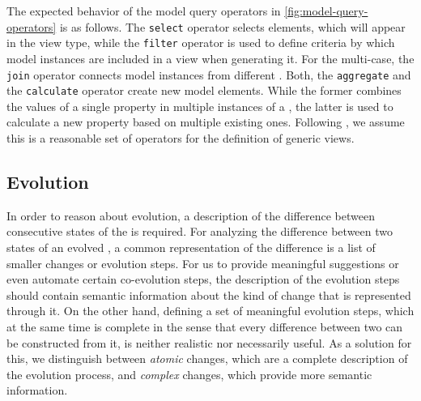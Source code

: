 The expected behavior of the model query operators in \cref{fig:model-query-operators} is as follows.
The \texttt{select} operator selects \metamodel elements, which will appear in the view type, while the \texttt{filter} operator is used to define criteria by which model instances are included in a view when generating it.
For the multi-\metamodel case, the \texttt{join} operator connects model instances from different \metamodels.
Both, the \texttt{aggregate} and the \texttt{calculate} operator create new model elements.
While the former combines the values of a single property in multiple instances of a \metaclass, the latter is used to calculate a new property based on multiple existing ones.
Following \textcite{burger_model-join_2016}, we assume this is a reasonable set of operators for the definition of generic views.

\subsection{\Metamodel Evolution}
\label{sec:MetaModelEvolution}

In order to reason about \metamodel evolution, a description of the difference between consecutive states of the \metamodel is required.
For analyzing the difference between two states of an evolved \metamodel, a common representation of the difference is a list of smaller changes or evolution steps.
For us to provide meaningful suggestions or even automate certain co-evolution steps, the description of the evolution steps should contain semantic information about the kind of change that is represented through it.
On the other hand, defining a set of meaningful evolution steps, which at the same time is complete in the sense that every difference between two \metamodels can be constructed from it, is neither realistic nor necessarily useful.
As a solution for this, we distinguish between \emph{atomic} \metamodel changes, which are a complete description of the evolution process, and \emph{complex} changes, which provide more semantic information.

